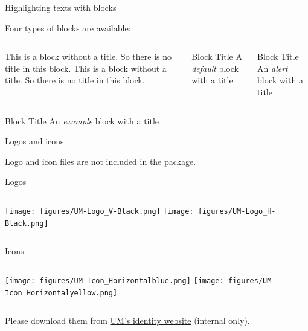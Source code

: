 \documentclass[12pt]{beamer}
\begin{document}
\begin{frame}{{\color{UMYellow} Highlighting} texts with blocks}

Four types of blocks are available:
\bigskip

\begin{columns}
		\begin{block}{}
		This is a block without a title. So there is no title in this block. This is a block without a title. So there is no title in this block. 

		\end{block}
		\begin{block}{Block Title}
		A \emph{default} block with a title
		\end{block}

		\begin{alertblock}{Block Title}
		An \emph{alert} block with a title
		\end{alertblock}

\end{columns} 
		\begin{exampleblock}{Block Title}
		An \emph{example} block with a title
		\end{exampleblock}
\end{frame}


\begin{frame}{Logos and icons}

Logo and icon files are \alert{not} included in the package. 

Logos
	\begin{columns}
        \centering
        \texttt{[image: figures/UM-Logo\_V-Black.png]}
        \centering
        \texttt{[image: figures/UM-Logo\_H-Black.png]}
	\end{columns} 

\vspace{10pt}

Icons
	\begin{columns}
	\column{0.48\linewidth}
        \centering
        \texttt{[image: figures/UM-Icon\_Horizontalblue.png]}
	\column{0.48\linewidth}
        \centering
        \texttt{[image: figures/UM-Icon\_Horizontalyellow.png]}
	\end{columns} 

\vspace{10pt}
Please download them from \href{https://identity.co.um.edu.mo/}{\myURL UM's identity website} (internal only).

\end{frame}
\end{document}
